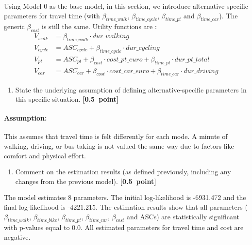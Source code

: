 \documentclass[11pt,a4paper]{article}
\begin{document}
Using Model 0 as the base model, in this section, we introduce alternative specific parameters for travel time (with $\beta_{time\_walk}$, $\beta_{time\_cycle}$, $\beta_{time\_pt}$ and $\beta_{time\_car}$). The generic $\beta_{cost}$ is still the same.
Utility functions are :  
\begin{align*}
    V_{walk} &= \beta_{time\_walk} \cdot dur\_walking \\
    V_{cycle} &= ASC_{cycle} + \beta_{time\_cycle} \cdot dur\_cycling \\
    V_{pt} &= ASC_{pt} + \beta_{cost} \cdot cost\_pt\_euro + \beta_{time\_pt} \cdot dur\_pt\_total \\
    V_{car} &= ASC_{car} + \beta_{cost} \cdot cost\_car\_euro + \beta_{time\_car} \cdot dur\_driving
\end{align*}


\begin{enumerate}
	\item State the underlying assumption of defining alternative-specific parameters in this specific situation. \textbf{[0.5~point]}
\end{enumerate}

\paragraph{Assumption:}

This assumes that travel time is felt differently for each mode. A minute of walking, driving, or bus taking is not valued the same way due to factors like comfort and physical effort.

\begin{enumerate}[resume]
	\item Comment on the estimation results (as defined previously, including any changes from the previous model). \textbf{[0.5~point]}
\end{enumerate}

The model estimates 8 parameters. The initial log-likelihood is -6931.472 and the final log-likelihood is -4221.215. 
The estimation results show that all parameters ($\beta_{time\_walk}$, $\beta_{time\_bike}$, $\beta_{time\_pt}$, $\beta_{time\_car}$, $\beta_{cost}$ and ASCs) are  statistically significant with p-values equal to 0.0.  
All estimated parameters for travel time and cost are negative.%
\end{document}
